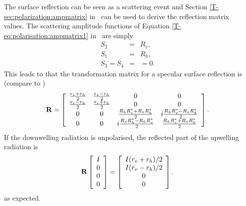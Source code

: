 The surface reflection can be seen as a scattering event and
Section \ref{T-sec:polarization:ampmatrix} in \theory\ can be used to derive the
reflection matrix values. The scattering amplitude functions of
Equation \ref{T-eq:polarisation:ampmatrix1} in \theory\ are simply
\begin{eqnarray}
  S_2 &=& R_v, \\
  S_1 &=& R_h, \\
  S_3 = S_4 &=& =0.
\end{eqnarray}
This leads to that the transformation matrix for a specular surface
reflection is (compare to \citet[Sec.\ 5.4.3]{liou:02})
\begin{equation}
  \label{eq:surface:specular_matrix}
  \mathbf{R} =
     \left[\begin{array}{cccc}
       \frac{r_v+r_h}{2}&\frac{r_v-r_h}{2}&0&0\\
       \frac{r_v-r_h}{2}&\frac{r_v+r_h}{2}&0&0\\
    0&0&\frac{R_hR_v^\ast+R_vR_h^\ast}{2}&i\frac{R_hR_v^\ast-R_vR_h^\ast}{2}\\
    0&0&i\frac{R_vR_h^\ast-R_hR_v^\ast}{2}&\frac{R_hR_v^\ast+R_vR_h^\ast}{2}\\
     \end{array}
     \right].
\end{equation}
If the downwelling radiation is unpolarised, the reflected part of the
upwelling radiation is
\begin{equation}
  \mathbf{R}
  \left[ \begin{array}{c} I\\0\\0\\0 \end{array} \right] =
  \left[ \begin{array}{c} I(r_v+r_h)/2\\I(r_v-r_h)/2\\0\\0 
  \end{array} \right].
\end{equation}
as expected.


